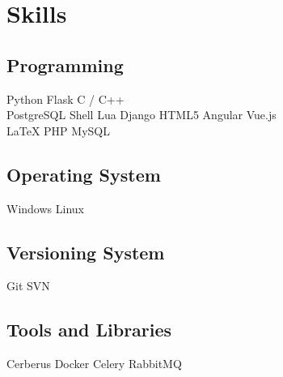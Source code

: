 \documentclass[top=0in]{deedy-resume-openfont}
\begin{document}
%
%
\lastupdated

%
%

%
%

\begin{minipage}[t]{0.33\textwidth} 


\section{Skills}
\subsection{Programming}
Python 
\textbullet{} Flask 
\textbullet{} C / C++ 
\\
PostgreSQL
\textbullet{} Shell 
\textbullet{} Lua
\textbullet{} Django
\textbullet{}HTML5
\textbullet{} Angular
\textbullet{} Vue.js
\\
\LaTeX
\textbullet{} PHP 
\textbullet{} MySQL
\sectionsep

\subsection{Operating System}
Windows 
\textbullet{} Linux 
\sectionsep

\subsection{Versioning System}
Git 
\textbullet{} SVN 
\sectionsep

\subsection{Tools and Libraries}
Cerberus 
\textbullet{} Docker 
\textbullet{} Celery
\textbullet{} RabbitMQ \\
\sectionsep


\end{minipage}
\end{document}
